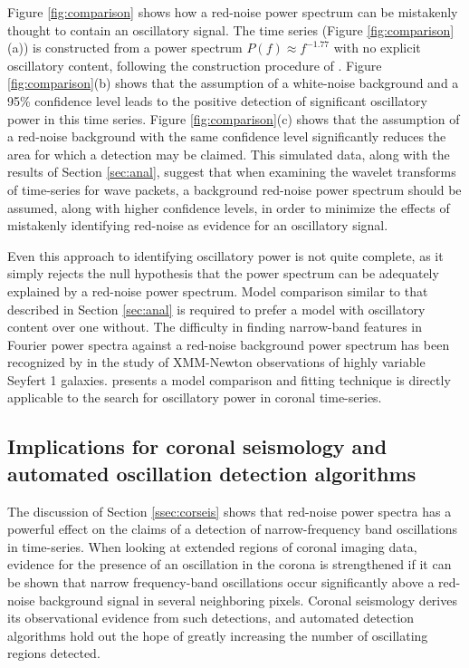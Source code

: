 \documentclass[preprint2]{aastex}
\begin{document}
Figure \ref{fig:comparison} shows how a red-noise power spectrum can
be mistakenly thought to contain an oscillatory signal.  The time
series (Figure \ref{fig:comparison}(a)) is constructed from a power
spectrum $P(f)\approx f^{-1.77}$ with no explicit oscillatory content,
following the construction procedure of \cite{2010MNRAS.402..307V}.
Figure \ref{fig:comparison}(b) shows that the assumption of a
white-noise background and a 95\% confidence level leads to the
positive detection of significant oscillatory power in this time
series. Figure \ref{fig:comparison}(c) shows that the assumption of a
red-noise background with the same confidence level significantly
reduces the area for which a detection may be claimed.  This simulated
data, along with the results of Section \ref{sec:anal}, suggest that
when examining the wavelet transforms of time-series for wave packets,
a background red-noise power spectrum should be assumed, along with
higher confidence levels, in order to minimize the effects of
mistakenly identifying red-noise as evidence for an oscillatory
signal.

Even this approach to identifying oscillatory power is not quite
complete, as it simply rejects the null hypothesis that the power
spectrum can be adequately explained by a red-noise power spectrum.
Model comparison similar to that described in Section \ref{sec:anal}
is required to prefer a model with oscillatory content over one
without. The difficulty in finding narrow-band features in Fourier
power spectra against a red-noise background power spectrum has been
recognized by \cite{2010MNRAS.402..307V} in the study of XMM-Newton
observations of highly variable Seyfert 1 galaxies.
\cite{2010MNRAS.402..307V} presents a model comparison and fitting
technique is directly applicable to the search for oscillatory power
in coronal time-series.


\subsection{Implications for coronal seismology and automated
  oscillation detection algorithms}\label{sec:oscdetect}

The discussion of Section \ref{ssec:corseis} shows that red-noise
power spectra has a powerful effect on the claims of a detection of
narrow-frequency band oscillations in time-series.  When looking at
extended regions of coronal imaging data, evidence for the presence of
an oscillation in the corona is strengthened if it can be shown that
narrow frequency-band oscillations occur significantly above a
red-noise background signal in several neighboring pixels.  Coronal
seismology derives its observational evidence from such detections,
and automated detection algorithms hold out the hope of greatly
increasing the number of oscillating regions detected.
\end{document}
